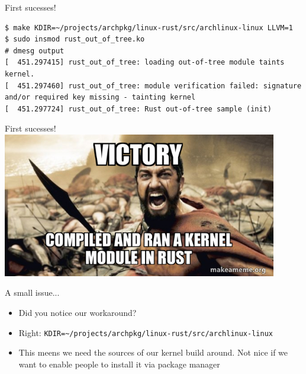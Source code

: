 \begin{frame}[c,fragile]{First sucesses!}
  \begin{verbatim}
$ make KDIR=~/projects/archpkg/linux-rust/src/archlinux-linux LLVM=1
$ sudo insmod rust_out_of_tree.ko
# dmesg output
[  451.297415] rust_out_of_tree: loading out-of-tree module taints kernel.
[  451.297460] rust_out_of_tree: module verification failed: signature and/or required key missing - tainting kernel
[  451.297724] rust_out_of_tree: Rust out-of-tree sample (init)

  \end{verbatim}
\end{frame}

\begin{frame}{First sucesses!}
  \centering
  \includegraphics[width=0.9\textwidth]{img/victory-compiled-and-loaded-kernel-module.jpg}
\end{frame}

\begin{frame}[c,fragile]{A small issue...}
  \begin{itemize}
    \item Did you notice our workaround?
      \pause
    \item Right: \texttt{KDIR=\textasciitilde/projects/archpkg/linux-rust/src/archlinux-linux}
    \item This meens we need the sources of our kernel build around. Not nice
      if we want to enable people to install it via package manager
  \end{itemize}
\end{frame}

